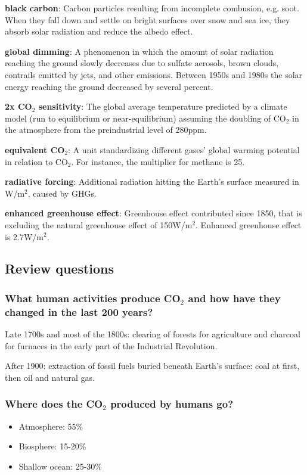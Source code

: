 \textbf{black carbon}: Carbon particles resulting from incomplete combusion,
e.g. soot. When they fall down and settle on bright surfaces over snow and
sea ice, they absorb solar radiation and reduce the albedo effect.

\textbf{global dimming}: A phenomenon in which the amount of solar radiation
reaching the ground slowly decreases due to sulfate aerosols, brown clouds,
contrails emitted by jets, and other emissions. Between 1950s and 1980s the
solar energy reaching the ground decreased by several percent.

\textbf{2x CO$_2$ sensitivity}: The global average temperature predicted by
a climate model (run to equilibrium or near-equilibrium) assuming the doubling
of CO$_2$ in the atmosphere from the preindustrial level of 280ppm.

\textbf{equivalent CO$_2$}: A unit standardizing different gases' global
warming potential in relation to CO$_2$. For instance, the multiplier for
methane is 25.

\textbf{radiative forcing}: Additional radiation hitting the Earth's surface
measured in W/m$^2$, caused by GHGs.

\textbf{enhanced greenhouse effect}: Greenhouse effect contributed since 1850,
that is excluding the natural greenhouse effect of 150W/m$^2$. Enhanced
greenhouse effect is 2.7W/m$^2$.

\subsection{Review questions}

\subsubsection{What human activities produce CO$_2$ and how have they changed
in the last 200 years?}

Late 1700s and most of the 1800s: clearing of forests for agriculture and
charcoal for furnaces in the early part of the Industrial Revolution.

After 1900: extraction of fossil fuels buried beneath Earth's surface: coal
at first, then oil and natural gas.

\subsubsection{Where does the CO$_2$ produced by humans go?}

\begin{itemize}
	\item Atmosphere: 55\%
	\item Biosphere: 15-20\%
	\item Shallow ocean: 25-30\%
\end{itemize}


